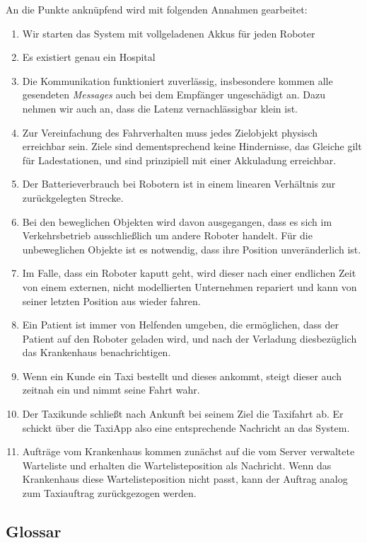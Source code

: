 An die Punkte anknüpfend wird mit folgenden Annahmen gearbeitet:
\begin{enumerate}
	\item Wir starten das System mit vollgeladenen Akkus für jeden Roboter
	\item Es existiert genau ein Hospital
	\item Die Kommunikation funktioniert zuverlässig, insbesondere kommen alle gesendeten \textit{Messages} auch bei dem Empfänger ungeschädigt an. Dazu nehmen wir auch an, dass die Latenz vernachlässigbar klein ist.
	\item Zur Vereinfachung des Fahrverhalten muss jedes Zielobjekt physisch erreichbar sein. Ziele sind dementsprechend keine Hindernisse, das Gleiche gilt für Ladestationen, und sind prinzipiell mit einer Akkuladung erreichbar.
	\item Der Batterieverbrauch bei Robotern ist in einem linearen Verhältnis zur zurückgelegten Strecke.
	\item Bei den beweglichen Objekten wird davon ausgegangen, dass es sich im Verkehrsbetrieb ausschließlich um andere Roboter handelt. 
	Für die unbeweglichen Objekte ist es notwendig, dass ihre Position unveränderlich ist.
	\item Im Falle, dass ein Roboter kaputt geht, wird dieser nach einer endlichen Zeit von einem externen, nicht modellierten Unternehmen repariert und kann von seiner letzten Position aus wieder fahren.
	\item Ein Patient ist immer von Helfenden umgeben, die ermöglichen, dass der Patient auf den Roboter geladen wird, und nach der Verladung diesbezüglich das Krankenhaus benachrichtigen.
	\item Wenn ein Kunde ein Taxi bestellt und dieses ankommt, steigt dieser auch zeitnah ein und nimmt seine Fahrt wahr.
	\item Der Taxikunde schließt nach Ankunft bei seinem Ziel die Taxifahrt ab. Er schickt über die TaxiApp also eine entsprechende Nachricht an das System.
	\item Aufträge vom Krankenhaus kommen zunächst auf die vom Server verwaltete Warteliste und erhalten die Wartelisteposition als Nachricht. Wenn das Krankenhaus diese Wartelisteposition nicht passt, kann der Auftrag analog zum Taxiauftrag zurückgezogen werden.

\end{enumerate}

\pagebreak

		\subsection{Glossar}

